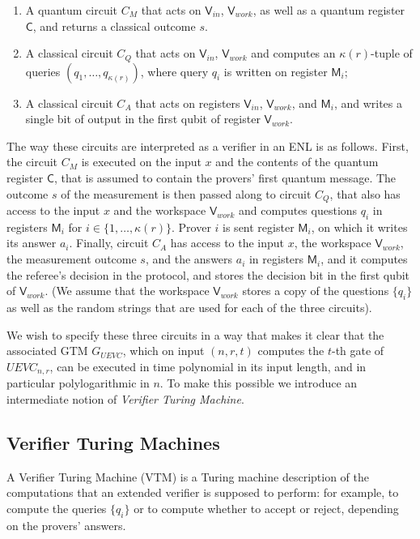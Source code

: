 \documentclass[11pt,letterpaper]{article}
\newcommand{\sC}{{\mathsf{C}}}
\newcommand{\sV}{{\mathsf{V}}}
\newcommand{\sM}{{\mathsf{M}}}
\begin{document}
\begin{enumerate}
\item A quantum circuit $C_M$ that acts on $\sV_{in}$, $\sV_{work}$, as well as a quantum register $\sC$, and returns a classical outcome $s$. %
\item A classical circuit $C_Q$ that acts on $\sV_{in}$, $\sV_{work}$ %
and computes an $\kappa(r)$-tuple of queries $(q_1,\ldots,q_{\kappa(r)})$, where query $q_i$ is written on register $\sM_i$;
\item A classical circuit $C_A$ that acts on registers $\sV_{in}$, $\sV_{work}$, %
and $\sM_{i}$, and writes a single bit of output in the first qubit of register $\sV_{work}$. %
\end{enumerate}
The way these circuits are interpreted as a verifier in an ENL is as follows. First, the circuit $C_M$ is executed on the input $x$ and the contents of the quantum register $\sC$, that is assumed to contain the provers' first quantum message. The outcome $s$ of the measurement is then passed along to circuit $C_Q$, that also has access to the input $x$ and the workspace $\sV_{work}$ and computes questions $q_i$ in registers $\sM_{i}$ for $i\in\{1,\ldots,\kappa(r)\}$. Prover $i$ is sent register $\sM_i$, on which it writes its answer $a_i$. Finally, circuit $C_A$ has access to the input $x$, the workspace $\sV_{work}$, the measurement outcome $s$, and the answers $a_i$ in registers $\sM_i$, and it computes the referee's decision in the protocol, and stores the decision bit in the first qubit of $\sV_{work}$. (We assume that the workspace $\sV_{work}$ stores a copy of the questions $\{q_i\}$ as well as the random strings that are used for each of the three circuits). 

We wish to specify these three circuits in a way that makes it clear that the associated GTM $G_{UEVC}$, which on input $(n,r,t)$ computes the $t$-th gate of $UEVC_{n,r}$, can be executed in time polynomial in its input length, and in particular polylogarithmic in $n$. To make this possible we introduce an intermediate notion of \emph{Verifier Turing Machine}. 

\subsection{ Verifier Turing Machines}
\label{sec:vtm}

A Verifier Turing Machine (VTM) is a Turing machine description of the computations that an extended verifier is supposed to perform: for example, to compute the queries $\{q_i\}$ or to compute whether to accept or reject, depending on the provers' answers.
\end{document}
